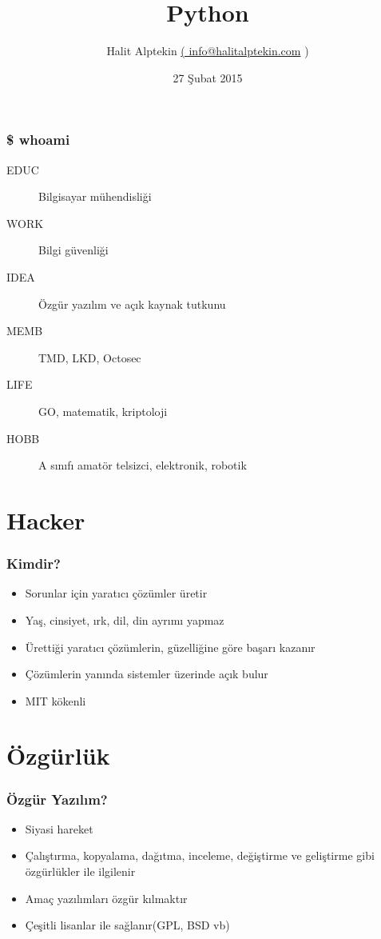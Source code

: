 \documentclass[10pt, compress]{beamer}
\title{Python}
\subtitle{}
\date{27 Şubat 2015}
\author{Halit Alptekin \href{mailto:info@halitalptekin.com}{( info@halitalptekin.com} )}
\institute{Karabük}
\begin{document}
\maketitle

\begin{frame}[fragile]
    \frametitle{\$ whoami}
    \begin{description}
        \item[EDUC] Bilgisayar mühendisliği
        \item[WORK] Bilgi güvenliği
        \item[IDEA] Özgür yazılım ve açık kaynak tutkunu
        \item[MEMB] TMD, LKD, Octosec
        \item[LIFE] GO, matematik, kriptoloji
        \item[HOBB] A sınıfı amatör telsizci, elektronik, robotik
    \end{description}
\end{frame}

\section{Hacker}

\begin{frame}[fragile]
    \frametitle{Kimdir?}
    \begin{itemize}[<+- | alert@+>]
        \item Sorunlar için yaratıcı çözümler üretir
        \item Yaş, cinsiyet, ırk, dil, din ayrımı yapmaz
        \item Ürettiği yaratıcı çözümlerin, güzelliğine göre başarı kazanır
        \item Çözümlerin yanında sistemler üzerinde açık bulur
        \item MIT kökenli
    \end{itemize}  
\end{frame}


\section{Özgürlük}

\begin{frame}[fragile]
    \frametitle{Özgür Yazılım?}
    \begin{itemize}[<+- | alert@+>]
        \item Siyasi hareket
        \item Çalıştırma, kopyalama, dağıtma, inceleme, değiştirme ve geliştirme gibi özgürlükler ile ilgilenir
        \item Amaç yazılımları özgür kılmaktır
        \item Çeşitli lisanlar ile sağlanır(GPL, BSD vb)
    \end{itemize}  
\end{frame}
\end{document}
